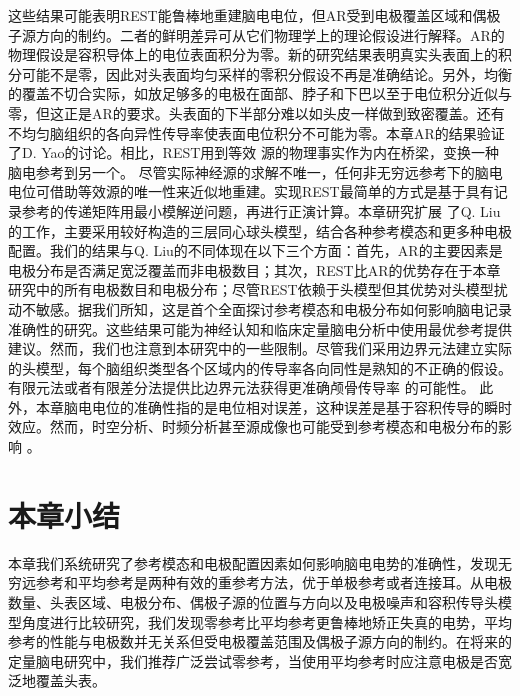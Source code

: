 这些结果可能表明REST能鲁棒地重建脑电电位，但AR受到电极覆盖区域和偶极子源方向的制约。二者的鲜明差异可从它们物理学上的理论假设进行解释。AR的物理假设是容积导体上的电位表面积分为零。新的研究结果表明真实头表面上的积分可能不是零，因此对头表面均匀采样的零积分假设不再是准确结论。另外，均衡的覆盖不切合实际，如放足够多的电极在面部、脖子和下巴以至于电位积分近似与零，但这正是AR的要求。头表面的下半部分难以如头皮一样做到致密覆盖。还有不均匀脑组织的各向异性传导率使表面电位积分不可能为零。本章AR的结果验证了D. Yao的讨论。相比，REST用到等效
源的物理事实作为内在桥梁，变换一种脑电参考到另一个。 尽管实际神经源的求解不唯一，任何非无穷远参考下的脑电电位可借助等效源的唯一性来近似地重建。实现REST最简单的方式是基于具有记录参考的传递矩阵用最小模解逆问题，再进行正演计算。本章研究扩展
了Q. Liu的工作，主要采用较好构造的三层同心球头模型，结合各种参考模态和更多种电极配置。我们的结果与Q. Liu的不同体现在以下三个方面：首先，AR的主要因素是电极分布是否满足宽泛覆盖而非电极数目；其次，REST比AR的优势存在于本章研究中的所有电极数目和电极分布；尽管REST依赖于头模型但其优势对头模型扰动不敏感。据我们所知，这是首个全面探讨参考模态和电极分布如何影响脑电记录准确性的研究。这些结果可能为神经认知和临床定量脑电分析中使用最优参考提供建议。然而，我们也注意到本研究中的一些限制。尽管我们采用边界元法建立实际的头模型，每个脑组织类型各个区域内的传导率各向同性是熟知的不正确的假设。有限元法或者有限差分法提供比边界元法获得更准确颅骨传导率
的可能性。 此外，本章脑电电位的准确性指的是电位相对误差，这种误差是基于容积传导的瞬时效应。然而，时空分析、时频分析甚至源成像也可能受到参考模态和电极分布的影响 。
\section{本章小结}
本章我们系统研究了参考模态和电极配置因素如何影响脑电电势的准确性，发现无穷远参考和平均参考是两种有效的重参考方法，优于单极参考或者连接耳。从电极数量、头表区域、电极分布、偶极子源的位置与方向以及电极噪声和容积传导头模型角度进行比较研究，我们发现零参考比平均参考更鲁棒地矫正失真的电势，平均参考的性能与电极数并无关系但受电极覆盖范围及偶极子源方向的制约。在将来的定量脑电研究中，我们推荐广泛尝试零参考，当使用平均参考时应注意电极是否宽泛地覆盖头表。